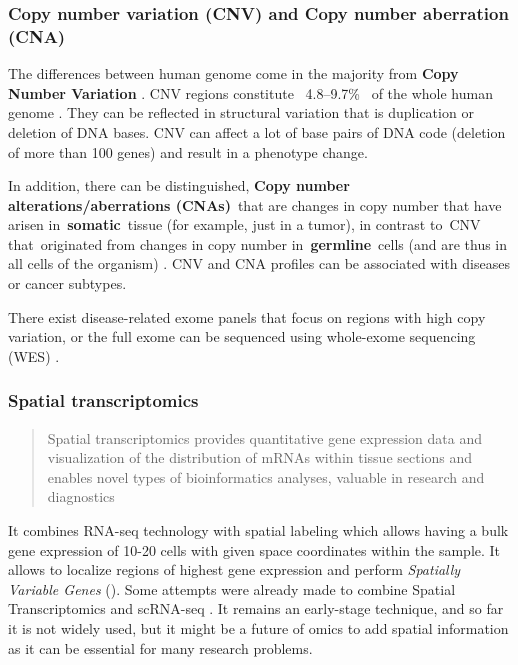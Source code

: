 \documentclass[12pt,]{book}
\theoremstyle{definition}
\theoremstyle{definition}
\theoremstyle{definition}
\theoremstyle{remark}
\begin{document}
\hypertarget{copy-number-variation-cnv-and-copy-number-aberration-cna}{%
\subsubsection{Copy number variation (CNV) and Copy number aberration
(CNA)}\label{copy-number-variation-cnv-and-copy-number-aberration-cna}}

The differences between human genome come in the majority from
\textbf{Copy Number Variation }\citep{McCarroll2007}. CNV regions
constitute ~4.8--9.7\%~ of the whole human genome \citep{Zarrei2015}.
They can be reflected in structural variation that is duplication or
deletion of DNA bases. CNV can affect a lot of base pairs of DNA code
(deletion of more than 100 genes) and result in a phenotype change.

In addition, there can be distinguished, \textbf{Copy number
alterations/aberrations (CNAs)}~that are changes in copy number that
have arisen in~\textbf{somatic}~tissue (for example, just in a tumor),
in contrast to~CNV that~originated from changes in copy number
in~\textbf{germline}~cells (and are thus in all cells of the organism)
\citep{McCarroll2007}. CNV and CNA profiles can be associated with
diseases or cancer subtypes.

There exist disease-related exome panels that focus on regions with high
copy variation, or the full exome can be sequenced using whole-exome
sequencing (WES) \citep{Yamamoto2016}.

\hypertarget{spatial-transcriptomics}{%
\subsubsection{Spatial transcriptomics}\label{spatial-transcriptomics}}

\begin{quote}
Spatial transcriptomics provides quantitative gene expression data and
visualization of the distribution of mRNAs within tissue sections and
enables novel types of bioinformatics analyses, valuable in research and
diagnostics \citep{Stahl2016}
\end{quote}

It combines RNA-seq technology with spatial labeling which allows having
a bulk gene expression of 10-20 cells with given space coordinates
within the sample. It allows to localize regions of highest gene
expression and perform \emph{Spatially Variable Genes}
(\citet{Svensson2018}). Some attempts were already made to combine
Spatial Transcriptomics and scRNA-seq \citep{Moncada2018}. It remains an
early-stage technique, and so far it is not widely used, but it might be
a future of omics to add spatial information as it can be essential for
many research problems.
\end{document}

